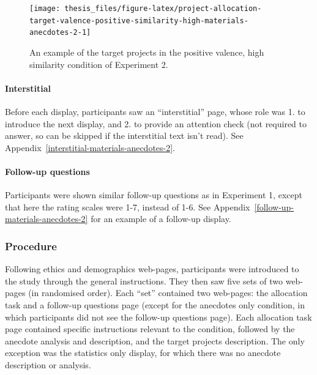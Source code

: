 \documentclass[a4paper, nobind, dvipsnames]{templates/ociamthesis}
\theoremstyle{definition}
\theoremstyle{definition}
\theoremstyle{definition}
\theoremstyle{definition}
\theoremstyle{remark}
\begin{document}
\begin{figure}
\texttt{[image: thesis\_files/figure-latex/project-allocation-target-valence-positive-similarity-high-materials-anecdotes-2-1]} \caption{An example of the target projects in the positive valence, high similarity condition of Experiment 2.}\label{fig:project-allocation-target-valence-positive-similarity-high-materials-anecdotes-2}
\end{figure}

\hypertarget{interstitial-3}{%
\paragraph{Interstitial}\label{interstitial-3}}

Before each display, participants saw an ``interstitial'' page, whose role was 1.
to introduce the next display, and 2. to provide an attention check (not
required to answer, so can be skipped if the interstitial text isn't read). See
Appendix~\ref{interstitial-materials-anecdotes-2}.

\hypertarget{follow-up-questions-1}{%
\paragraph{Follow-up questions}\label{follow-up-questions-1}}

Participants were shown similar follow-up questions as in Experiment 1, except
that here the rating scales were 1-7, instead of 1-6. See
Appendix~\ref{follow-up-materials-anecdotes-2} for an example of a follow-up
display.

\hypertarget{procedure-4}{%
\subsubsection{Procedure}\label{procedure-4}}

Following ethics and demographics web-pages, participants were introduced to the
study through the general instructions. They then saw five sets of two web-pages
(in randomised order). Each ``set'' contained two web-pages: the allocation task
and a follow-up questions page (except for the anecdotes only condition, in
which participants did not see the follow-up questions page). Each allocation
task page contained specific instructions relevant to the condition, followed by
the anecdote analysis and description, and the target projects description. The
only exception was the statistics only display, for which there was no anecdote
description or analysis.
\end{document}
